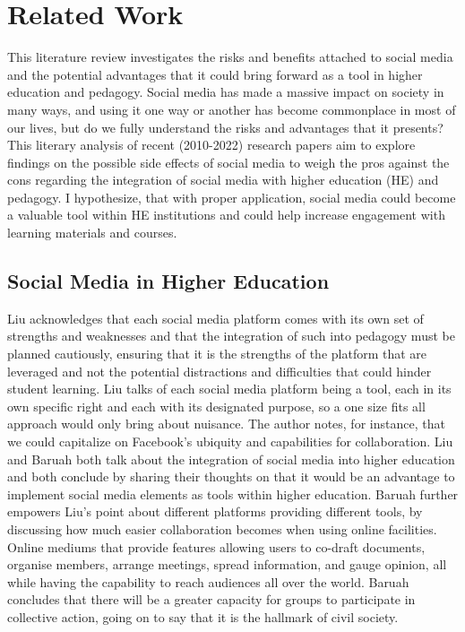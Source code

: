 \documentclass[lettersize,journal]{IEEEtran}
\begin{document}
\section{Related Work}
    This literature review investigates the risks and benefits attached to
    social media and the potential advantages that it could bring forward as a
    tool in higher education and pedagogy. Social media has made a massive
    impact on society in many ways, and using it one way or another has become
    commonplace in most of our lives, but do we fully understand the risks and
    advantages that it presents? This literary analysis of recent (2010-2022)
    research papers aim to explore findings on the possible side effects of
    social media to weigh the pros against the cons regarding
    the integration of social media with higher education (HE) and pedagogy. I
    hypothesize, that with proper application, social media could become a valuable
    tool within HE institutions and could help increase engagement with learning
    materials and courses.
\subsection{Social Media in Higher Education}
    Liu \cite{Liu2010} acknowledges that each social media platform comes with
    its own set of strengths and weaknesses and that the integration of such into
    pedagogy must be planned cautiously, ensuring that it is the strengths of the platform
    that are leveraged and not the potential distractions and difficulties that could
    hinder student learning. Liu talks of each social media platform being a tool,
    each in its own specific right and each with its designated purpose, so a one size
    fits all approach would only bring about nuisance. The author notes, for instance,
    that we could capitalize on Facebook's ubiquity and capabilities for collaboration.
    Liu \cite{Liu2010} and Baruah \cite{Baruah2012} both talk about the integration of
    social media into higher education and both conclude by sharing their thoughts on that
    it would be an advantage to implement social media elements as tools within higher
    education. Baruah further empowers Liu's point about different platforms providing
    different tools, by discussing how much easier collaboration becomes when using
    online facilities. Online mediums that provide features allowing users to co-draft
    documents, organise members, arrange meetings, spread information, and gauge opinion,
    all while having the capability to reach audiences all over the world.
    Baruah concludes that there will be a greater capacity for groups to participate in
    collective action, going on to say that it is the hallmark of civil society.
\end{document}
